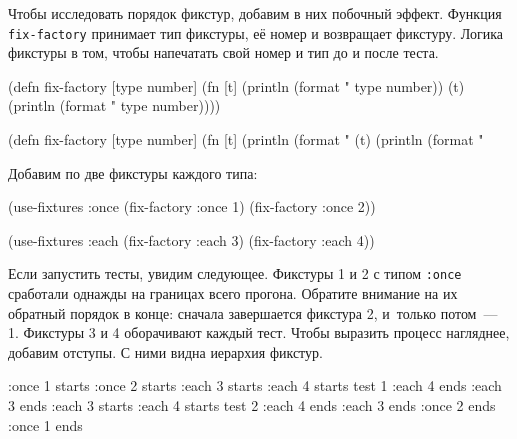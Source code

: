 Чтобы исследовать порядок фикстур, добавим в них побочный эффект. Функция
\verb|fix-factory| принимает тип фикстуры, её номер и возвращает
фикстуру. Логика фикстуры в том, чтобы напечатать свой номер и тип до и после
теста.


\ifnarrow

\begin{english}
  \begin{clojure}
(defn fix-factory [type number]
  (fn [t]
    (println (format "%
               type number))
    (t)
    (println (format "%
               type number))))
  \end{clojure}
\end{english}

\else

\begin{english}
  \begin{clojure}
(defn fix-factory [type number]
  (fn [t]
    (println (format "%
    (t)
    (println (format "%
  \end{clojure}
\end{english}

\fi

\noindent
Добавим по две фикстуры каждого типа:

\begin{english}
  \begin{clojure}
(use-fixtures :once
  (fix-factory :once 1)
  (fix-factory :once 2))

(use-fixtures :each
  (fix-factory :each 3)
  (fix-factory :each 4))
  \end{clojure}
\end{english}

Если запустить тесты, увидим следующее. Фикстуры 1 и 2 с типом \verb|:once|
сработали однажды на границах всего прогона. Обратите внимание на их обратный
порядок в конце: сначала завершается фикстура 2, и~только потом~--- 1. Фикстуры
3 и 4 оборачивают каждый тест. Чтобы выразить процесс нагляднее, добавим
отступы. С ними видна иерархия фикстур.


\begin{english}
  \begin{clojure}
:once 1 starts
  :once 2 starts
    :each 3 starts
      :each 4 starts
        test 1
      :each 4 ends
    :each 3 ends
    :each 3 starts
      :each 4 starts
        test 2
      :each 4 ends
    :each 3 ends
  :once 2 ends
:once 1 ends
  \end{clojure}
\end{english}


